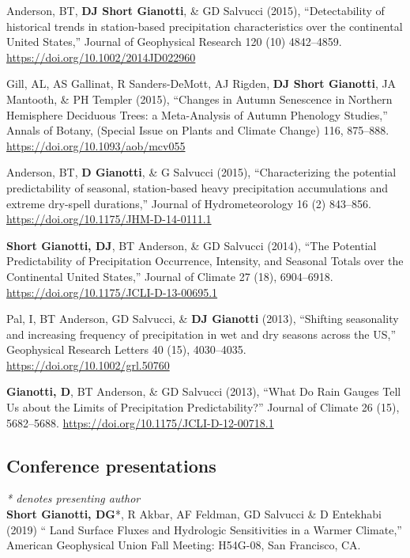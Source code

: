 \documentclass[10pt, a4paper]{article}
\renewcommand{\emph}[1]{\textit{#1}}
\newcommand{\lbr}{\vspace*{12pt}}
\newcommand{\years}[1]{\mbox{}\marginnote{\scriptsize #1}} %
\begin{document}
\years{2015c}Anderson, BT, \textbf{DJ Short Gianotti}, \& GD Salvucci (2015), ``Detectability of historical trends in station-based precipitation characteristics over the continental United States,'' Journal of Geophysical Research 120 (10) 4842--4859. \url{https://doi.org/10.1002/2014JD022960} \lbr

\years{2015b}Gill, AL, AS Gallinat, R Sanders-DeMott, AJ Rigden, \textbf{DJ Short Gianotti}, JA Mantooth, \& PH Templer (2015), ``Changes in Autumn Senescence in Northern Hemisphere Deciduous Trees: a Meta-Analysis of Autumn Phenology Studies,'' Annals of Botany, (Special Issue on Plants and Climate Change) 116, 875--888. \url{https://doi.org/10.1093/aob/mcv055} \lbr

\years{2015a}Anderson, BT, \textbf{D Gianotti}, \& G Salvucci (2015), ``Characterizing the potential predictability of seasonal, station-based heavy precipitation accumulations and extreme dry-spell durations,'' Journal of Hydrometeorology 16 (2) 843--856. \url{https://doi.org/10.1175/JHM-D-14-0111.1} \lbr

\years{2014a}\textbf{Short Gianotti, DJ}, BT Anderson, \& GD Salvucci (2014), ``The Potential Predictability of Precipitation Occurrence, Intensity, and Seasonal Totals over the Continental United States,'' Journal of Climate 27 (18), 6904--6918. \url{https://doi.org/10.1175/JCLI-D-13-00695.1} \lbr

\years{2013b}Pal, I, BT Anderson, GD Salvucci, \& \textbf{DJ Gianotti} (2013), ``Shifting seasonality and increasing frequency of precipitation in wet and dry seasons across the US,'' Geophysical Research Letters 40 (15), 4030--4035. \url{https://doi.org/10.1002/grl.50760} \lbr

\years{2013a}\textbf{Gianotti, D}, BT Anderson, \& GD Salvucci (2013), ``What Do Rain Gauges Tell Us about the Limits of Precipitation Predictability?'' Journal of Climate 26 (15), 5682--5688. \url{https://doi.org/10.1175/JCLI-D-12-00718.1} \lbr

\subsection*{Conference presentations}
\emph{* denotes presenting author} \\

\noindent
\years{2019}\textbf{Short Gianotti, DG}*, R Akbar, AF Feldman, GD Salvucci \& D Entekhabi (2019) `` Land Surface Fluxes and Hydrologic Sensitivities in a Warmer Climate,'' American Geophysical Union Fall Meeting: H54G-08, San Francisco, CA.\lbr %
\end{document}
